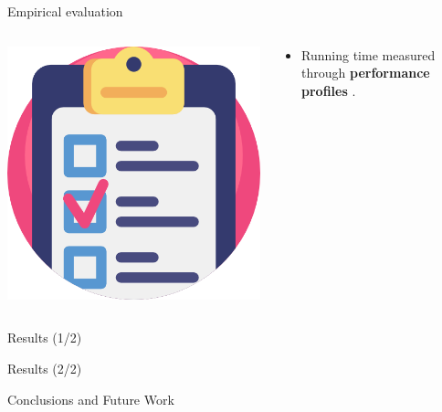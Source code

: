 \begin{frame}{Empirical evaluation}
	\begin{columns}
		\begin{column}{0.2\textwidth}
			\centering
			\includegraphics[width=\textwidth]{./Imgs/testing.png}
		\end{column}
		\begin{column}{0.8\textwidth}
			\begin{itemize}
				\item Running time measured through \textbf{performance profiles} \parencite{dolan2002}.
			\end{itemize}
		\end{column}
	\end{columns}
\end{frame}

\begin{frame}{Results (1/2)}

\end{frame}

\begin{frame}{Results (2/2)}

\end{frame}

\begin{frame}{Conclusions and Future Work}
\end{frame}

